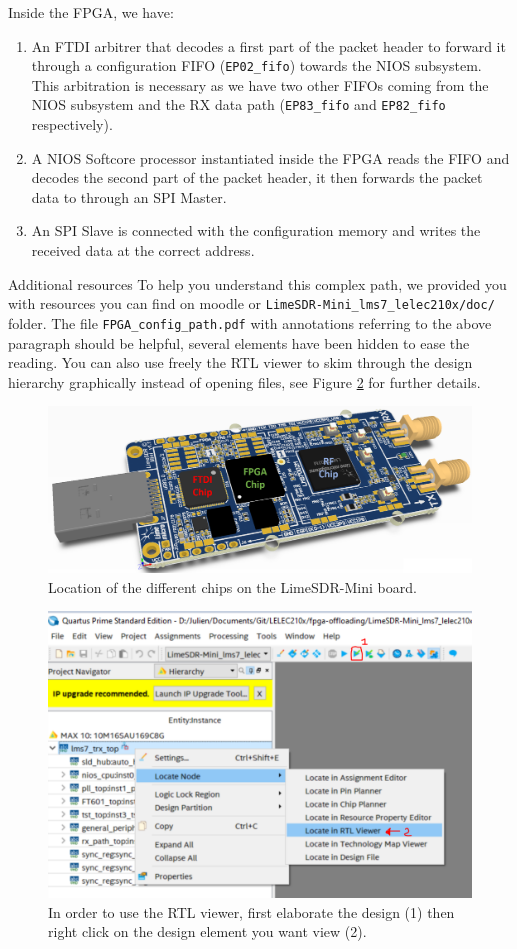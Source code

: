 Inside the FPGA, we have:
\begin{enumerate}
    \item An FTDI arbitrer that decodes a first part of the packet header to forward it through a configuration FIFO (\texttt{EP02\_fifo}) towards the NIOS subsystem. This arbitration is necessary as we have two other FIFOs coming from the NIOS subsystem and the RX data path (\texttt{EP83\_fifo} and \texttt{EP82\_fifo} respectively).
    \item A NIOS Softcore processor instantiated inside the FPGA reads the FIFO and decodes the second part of the packet header, it then forwards the packet data to through an SPI Master.
    \item An SPI Slave is connected with the configuration memory and writes the received data at the correct address.
\end{enumerate}

\begin{bclogo}[couleur = gray!20, arrondi = 0.2, logo=\bcinfo]{Additional resources}
To help you understand this complex path, we provided you with resources you can find on moodle or \texttt{LimeSDR-Mini\_lms7\_lelec210x/doc/} folder. The file \texttt{FPGA\_config\_path.pdf} with annotations referring to the above paragraph should be helpful, several elements have been hidden to ease the reading. You can also use freely the RTL viewer to skim through the design hierarchy graphically instead of opening files, see Figure \ref{fig:rtl_viewer} for further details.
\end{bclogo}

\begin{figure}[!h]
    \centering
    \includegraphics[width=0.7\linewidth]{figures/limesdrmini_schematic.png}
    \caption{Location of the different chips on the LimeSDR-Mini board.}
    \label{fig:limesdr_mini_schematic}
\end{figure}

\begin{figure}[!h]
    \centering
    \includegraphics[width=0.7\linewidth]{figures/rtl_viewer.png}
    \caption{In order to use the RTL viewer, first elaborate the design (1) then right click on the design element you want view (2).}
    \label{fig:rtl_viewer}
\end{figure}
